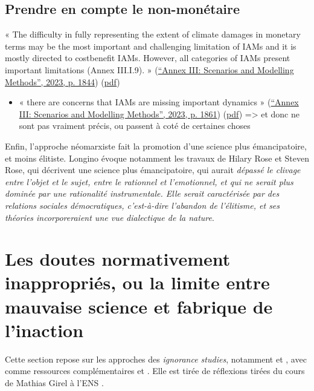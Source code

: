 \subsection{Prendre en compte le non-monétaire}


« The difficulty in fully representing the extent of climate damages in monetary terms may be the most important and challenging limitation of IAMs and it is mostly directed to costbenefit IAMs. However, all categories of IAMs present important limitations (Annex III.I.9). » (\href{zotero://select/library/items/2SDDNUUF}{“Annex III: Scenarios and Modelling Methods”, 2023, p. 1844}) (\href{zotero://open-pdf/library/items/CHVFSLLH?page=4&annotation=YT933ZM4}{pdf})
 

\begin{itemize}
    \item « there are concerns that IAMs are missing important dynamics » (\href{zotero://select/library/items/2SDDNUUF}{“Annex III: Scenarios and Modelling Methods”, 2023, p. 1861}) (\href{zotero://open-pdf/library/items/CHVFSLLH?page=21&annotation=WDMBNU3A}{pdf})
=> et donc ne sont pas vraiment précis, ou passent à coté de certaines choses

\end{itemize}


Enfin, l'approche néomarxiste fait la promotion d'une science plus émancipatoire, et moins élitiste. Longino évoque notamment les travaux de Hilary Rose et Steven Rose, qui décrivent une science plus émancipatoire, qui aurait \emph{dépassé le clivage entre l'objet et le sujet, entre le rationnel et l'emotionnel, et qui ne serait plus dominée par une rationalité instrumentale. Elle serait caractérisée par des relations sociales démocratiques, c'est-à-dire l'abandon de l'élitisme, et ses théories incorporeraient une vue dialectique de la nature}.



\section{Les doutes normativement inappropriés, ou la limite entre mauvaise science et fabrique de l'inaction}

Cette section repose sur les approches des \textit{ignorance studies}, notamment \cite{melo-martin_fight_2018} et \cite{gross_routledge_2015}, avec comme ressources complémentaires \cite{noauthor_carnet_2024} et \cite{proctor_agnotology_2008}. Elle est tirée de réflexions tirées du cours de Mathias Girel à l'ENS \cite{girel_vertus_2023}. 



